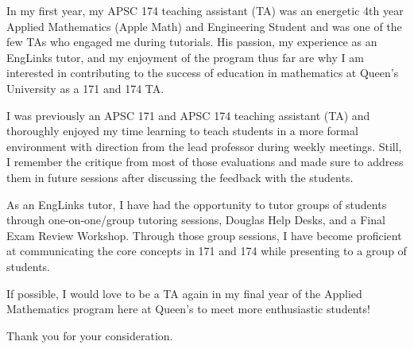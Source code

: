 \documentclass[../bryan-hoang-cover-letter.tex]{subfiles}
\begin{document}



  \makelettertitle{}

  \begin{cvletter}
    In my first year, my APSC 174 teaching assistant (TA) was an energetic 4th year Applied Mathematics (Apple Math) and Engineering Student and was one of the few TAs who engaged me during tutorials. His passion, my experience as an EngLinks tutor, and my enjoyment of the program thus far are why I am interested in contributing to the success of education in mathematics at Queen's University as a 171 and 174 TA.

    I was previously an APSC 171 and APSC 174 teaching assistant (TA) and thoroughly enjoyed my time learning to teach students in a more formal environment with direction from the lead professor during weekly meetings. Still, I remember the critique from most of those evaluations and made sure to address them in future sessions after discussing the feedback with the students.

    As an EngLinks tutor, I have had the opportunity to tutor groups of students through one-on-one/group tutoring sessions, Douglas Help Desks, and a Final Exam Review Workshop. Through those group sessions, I have become proficient at communicating the core concepts in 171 and 174 while presenting to a group of students.

    If possible, I would love to be a TA again in my final year of the Applied Mathematics program here at Queen's to meet more enthusiastic students!

    Thank you for your consideration.
  \end{cvletter}
\end{document}
